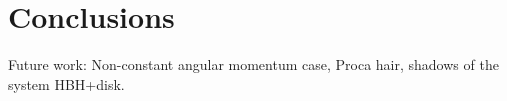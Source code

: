 \documentclass[twocolumn,aps,showpacs,showkeys,prd,superscriptaddress,byrevtex, amsmath]{revtex4-1}
\begin{document}
\section{Conclusions}
\label{conclusions}

Future work: Non-constant angular momentum case, Proca hair, shadows of the system HBH+disk.

\begin{acknowledgements}

\end{acknowledgements}




\begin{appendix}


\end{appendix}
\end{document}
